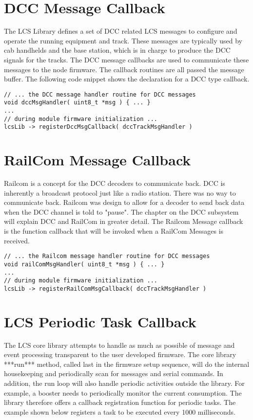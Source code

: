 \section{DCC Message Callback}

The LCS Library defines a set of DCC related LCS messages to configure and operate the running equipment and track. These messages are typically used by cab handhelds and the base station, which is in charge to produce the DCC signals for the tracks. The DCC message callbacks are used to communicate these messages to the node firmware. The callback routines are all passed the message buffer. The following code snippet shows the declaration for a DCC type callback.

\lstset{style=codesnippetstyle}
\begin{lstlisting}
// ... the DCC message handler routine for DCC messages
void dccMsgHandler( uint8_t *msg ) { ... }
...
// during module firmware initialization ...
lcsLib -> registerDccMsgCallback( dccTrackMsgHandler )
\end{lstlisting}

\section{RailCom Message Callback}

Railcom is a concept for the DCC decoders to communicate back. DCC is inherently a broadcast protocol just like a radio station. There was no way to communicate back.  Railcom was design to allow for a decoder to send back data when the DCC channel is told to "pause". The chapter on the DCC subsystem will explain DCC and RailCom in greater detail. The Railcom Message callback is the function callback that will be invoked when a RailCom Messages is received.

\lstset{style=codesnippetstyle}
\begin{lstlisting}
// ... the Railcom message handler routine for DCC messages
void railComMsgHandler( uint8_t *msg ) { ... }
...
// during module firmware initialization ...
lcsLib -> registerRailComMsgCallback( dccTrackMsgHandler )
\end{lstlisting}

\section{LCS Periodic Task Callback}

The LCS core library attempts to handle as much as possible of message and event processing transparent to the user developed firmware. The core library ***run*** method, called last in the firmware setup sequence, will do the internal housekeeping and periodically scan for messages and serial commands. In addition, the run loop will also handle periodic activities outside the library. For example, a booster needs to periodically monitor the current consumption. The library therefore offers a callback registration function for periodic tasks. The example shown below registers a task to be executed every 1000 milliseconds.

